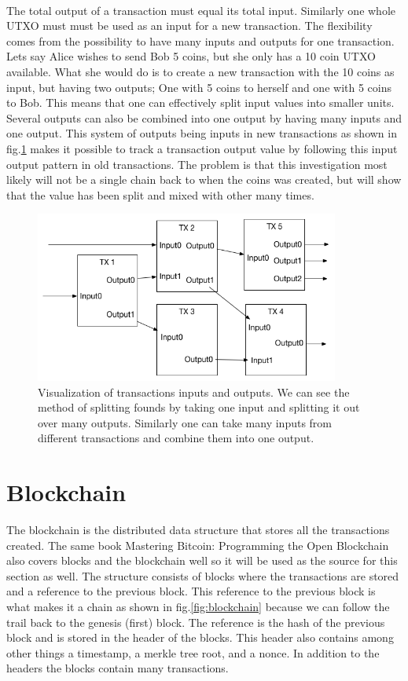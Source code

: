 \documentclass[informationsecurity]{gucmasterproject}
\begin{document}
\paragraph{}
The total output of a transaction must equal its total input. Similarly one whole UTXO must must be used as an input for a new transaction.
The flexibility comes from the possibility to have many inputs and outputs for one transaction.
Lets say Alice wishes to send Bob 5 coins, but she only has a 10 coin UTXO available. What she would do is to create a new transaction with the 10 coins as input, but having two outputs; One with 5 coins to herself and one with 5 coins to Bob.
This means that one can effectively split input values into smaller units. Several outputs can also be combined into one output by having many inputs and one output. 
This system of outputs being inputs in new transactions as shown in fig.\ref{fig:ln_trans} makes it possible to track a transaction output value by following this input output pattern in old transactions. The problem is that this investigation most likely will not be a single chain back to when the coins was created, but will show that the value has been split and mixed with other many times.


\begin{figure}[h]
    \centering
    \includegraphics[width=10cm]{figs/LN_Trans.png}
    \caption{Visualization of transactions inputs and outputs. We can see the method of splitting founds by taking one input and splitting it out over many outputs. Similarly one can take many inputs from different transactions and combine them into one output.}
    \label{fig:ln_trans}
\end{figure}

\section{Blockchain}
The blockchain is the distributed data structure that stores all the transactions created. The same book Mastering Bitcoin: Programming the Open Blockchain \cite{antonopoulos2017mastering} also covers blocks and the blockchain well so it will be used as the source for this section as well. The structure consists of blocks where the transactions are stored and a reference to the previous block. This reference to the previous block is what makes it a chain as shown in fig.\ref{fig:blockchain} because we can follow the trail back to the genesis (first) block. The reference is the hash of the previous block and is stored in the header of the blocks. This header also contains among other things a timestamp, a merkle tree root, and a nonce. In addition to the headers the blocks contain many transactions.
\end{document}
